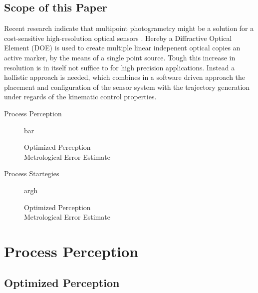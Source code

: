 \documentclass[5p,times,procedia]{elsarticle}
\begin{document}
\subsection{Scope of this Paper}
Recent research indicate that multipoint photogrametry might be a solution for a cost-sensitive high-resolution optical sensors \cite{Hartlieb_2021}. Hereby a Diffractive Optical Element (DOE) is used to create multiple linear indepenent optical copies an active marker, by the means of a single point source. Tough this increase in
resolution is in itself not suffice to for high precision applications. Instead a hollistic approach is needed, which combines in a software driven approach the placement and configuration of the sensor system with the trajectory generation under regards of the kinematic control properties.

\begin{description}
	
	\item[Process Perception]
	bar
	\begin{description}
		\item[Optimized Perception]
		\item[Metrological Error Estimate]
	\end{description}
	\item[Process Startegies] argh
	\begin{description}
		\item[Optimized Perception]
		\item[Metrological Error Estimate]
	\end{description}
\end{description}


\vspace*{8pt}

\section{Process Perception}


\subsection{Optimized Perception}
\end{document}

